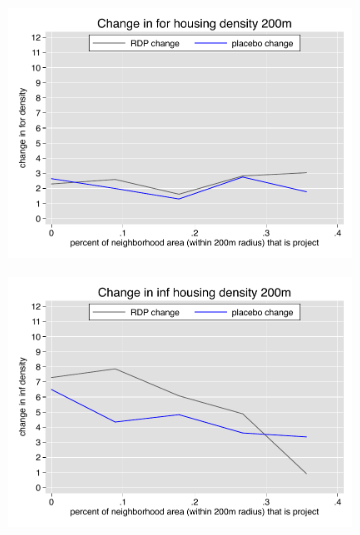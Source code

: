 \documentclass[12pt]{article}
\begin{document}
\begin{figure}
        \begin{subfigure}[b]{0.495\textwidth}
            \centering
            \includegraphics[width=\textwidth,trim={0.3cm .3cm 0.1cm 0cm}, clip=true]{figures/change_for_200_total.pdf}
        \end{subfigure}
        \hfill
        \begin{subfigure}[b]{0.495\textwidth}  
            \centering 
            \includegraphics[width=\textwidth,trim={0.3cm .3cm 0.1cm 0cm}, clip=true]{figures/change_inf_200_total.pdf}
        \end{subfigure}
        \vspace{-6mm}
    \end{figure} 
\end{document}
